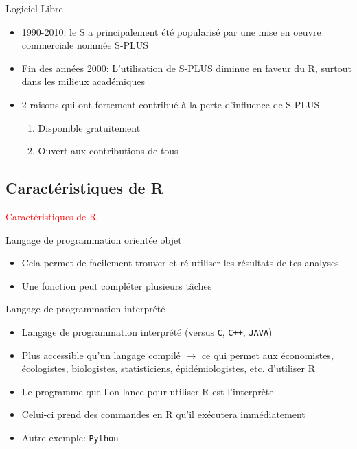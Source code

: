 \documentclass[11pt]{beamer}\usepackage[]{graphicx}\usepackage[]{color}
\newcommand{\code}[1]{\texttt{#1}}
\begin{document}
\begin{frame}{Logiciel Libre}
\begin{itemize}
  \setlength\itemsep{2em}
\item 1990-2010: le S a principalement \'{e}t\'{e} popularis\'{e} par une mise en oeuvre commerciale nomm\'{e}e S-PLUS
\pause \item Fin des ann\'{e}es 2000: L'utilisation de S-PLUS diminue en faveur du R, surtout dans les milieux acad\'{e}miques
\pause \item 2 raisons qui ont fortement contribu\'{e} \`{a} la perte d'influence de S-PLUS
\begin{enumerate}
\item \normalsize Disponible gratuitement
\pause \item Ouvert aux contributions de tous
\end{enumerate}
\end{itemize}
\end{frame}



\subsection{Caract\'{e}ristiques de R}

\begin{frame}
 \begin{center}
  \Huge{\textcolor{red}{Caract\'{e}ristiques de R}}
 \end{center}
\end{frame}



\begin{frame}{Langage de programmation orientée objet}
\begin{itemize}
  \setlength\itemsep{2em}
\item Cela permet de facilement trouver et ré-utiliser les résultats de tes analyses
\pause \item Une fonction peut compléter plusieurs t\^{a}ches
\end{itemize}
\end{frame}


\begin{frame}{Langage de programmation interpr\'{e}t\'{e}}
\begin{itemize}
  \setlength\itemsep{2em}
\item Langage de programmation interpr\'{e}t\'{e} (versus \code{C}, \code{C++}, \code{JAVA})
\item Plus accessible qu'un langage compilé $\rightarrow$ ce qui permet aux économistes, écologistes, biologistes, statisticiens, épidémiologistes, etc. d'utiliser R  
\pause \item Le programme que l'on lance pour utiliser R est l'interpr\`{e}te
\pause \item Celui-ci prend des commandes en R qu'il ex\'{e}cutera imm\'{e}diatement
\pause \item  Autre exemple: \code{Python}
\end{itemize}
\end{frame}
\end{document}

